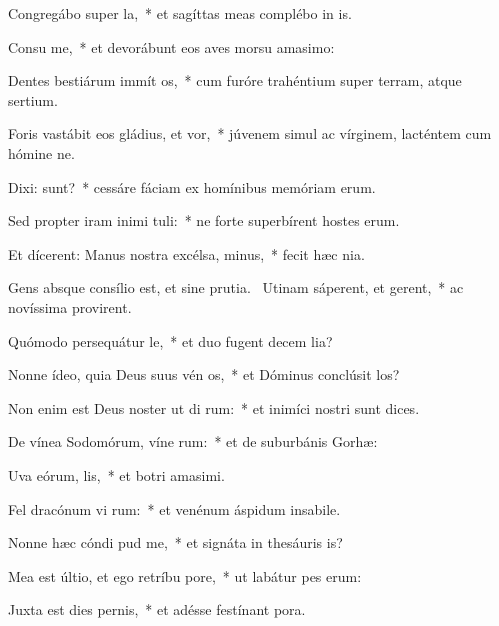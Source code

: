 \item Congregábo super  la,~* et sagíttas meas complébo in is.
\item Consu me,~* et devorábunt eos aves morsu amasimo:
\item Dentes bestiárum immít  os,~* cum furóre trahéntium super terram, atque sertium.
\item Foris vastábit eos gládius, et  vor,~* júvenem simul ac vírginem, lacténtem cum hómine ne.
\item Dixi:  sunt?~* cessáre fáciam ex homínibus memóriam erum.
\item Sed propter iram inimi tuli:~* ne forte superbírent hostes erum.
\item Et dícerent: Manus nostra excélsa,   minus,~* fecit hæc nia.
\item Gens absque consílio est, et sine prutia.~\pscross{} Utinam sáperent, et gerent,~* ac novíssima provirent.
\item Quómodo persequátur  le,~* et duo fugent decem lia?
\item Nonne ídeo, quia Deus suus vén os,~* et Dóminus conclúsit los?
\item Non enim est Deus noster ut di rum:~* et inimíci nostri sunt dices.
\item De vínea Sodomórum, víne rum:~* et de suburbánis Gorhæ:
\item Uva eórum,  lis,~* et botri amasimi.
\item Fel dracónum vi rum:~* et venénum áspidum insabile.
\item Nonne hæc cóndi  pud me,~* et signáta in thesáuris is?
\item Mea est últio, et ego retríbu  pore,~* ut labátur pes erum:
\item Juxta est dies pernis,~* et adésse festínant pora.
